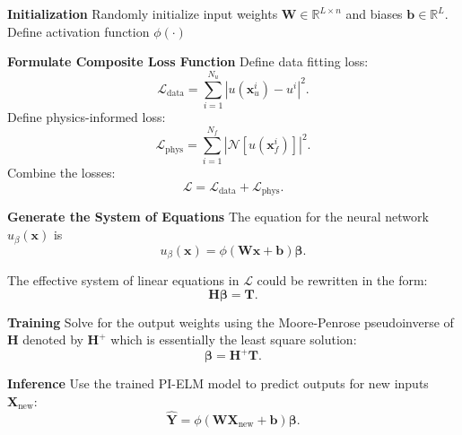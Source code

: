 \documentclass{article}
\begin{document}
\begin{algorithm}[!h]
\caption{PI-ELM}
\begin{algorithmic}[1]
\label{algo_pielm}

\STATE \textbf{Initialization}
Randomly initialize input weights $\mathbf{W} \in \mathbb{R}^{L \times n}$ and biases $\mathbf{b} \in \mathbb{R}^L$.
Define activation function $\phi(\cdot)$

\STATE \textbf{Formulate Composite Loss Function}
Define data fitting loss: 
\begin{equation}
\mathcal{L}_{\text{data}} = \sum_{i=1}^{N_u} \left| u(\mathbf{x}_u^i) - u^i \right|^2.
\end{equation}
Define physics-informed loss:
\begin{equation}
\mathcal{L}_{\text{phys}} = \sum_{i=1}^{N_f} \left| \mathcal{N}[u(\mathbf{x}_f^i)] \right|^2.
\end{equation}
Combine the losses:
\begin{equation}
\mathcal{L} = \mathcal{L}_{\text{data}} + \mathcal{L}_{\text{phys}}.
\end{equation}

\STATE \textbf{Generate the System of Equations}
The equation for the neural network $u_\beta(\mathbf{x})$ is
\begin{equation}
\label{eq:elm}
u_\beta(\mathbf{x}) = \phi(\mathbf{W} \mathbf{x} + \mathbf{b}) \mathbf{\beta}.
\end{equation}

The effective system of linear equations in $\mathcal{L}$ could be rewritten in the form:
\begin{equation}
\label{eq:PIELM_Inversion}
\mathbf{H} \mathbf{\beta}  = \mathbf{T}.
\end{equation}

\STATE \textbf{Training}
Solve for the output weights using the Moore-Penrose pseudoinverse of $\mathbf{H}$ denoted by $\mathbf{H}^+$ which is essentially the least square solution:
\begin{equation}
\mathbf{\beta} = \mathbf{H}^+ \mathbf{T}.
\end{equation}

\STATE \textbf{Inference}
Use the trained PI-ELM model to predict outputs for new inputs $\mathbf{X}_{\text{new}}$:
\begin{equation}
\mathbf{\hat{Y}} = \phi(\mathbf{W} \mathbf{X}_{\text{new}} + \mathbf{b}) \mathbf{\beta}.
\end{equation}

\end{algorithmic}
\end{algorithm}
\end{document}
